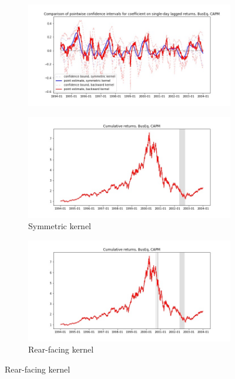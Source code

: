 \documentclass{article}
\begin{document}
\newpage

\begin{figure}

\centering

  \begin{subfigure}[b]{\textwidth}
    \includegraphics[width=\textwidth]{BusEq/pointwiseCIs_layered_CAPM.jpg}
    \label{fig:1}
  \end{subfigure}
  \begin{subfigure}[b]{0.45\textwidth}
    \includegraphics[width=\textwidth]{BusEq/full_cumrets_ofint_CAPM.jpg}
    \caption*{Symmetric kernel}
    \label{fig:2}
  \end{subfigure}
   \begin{subfigure}[b]{0.45\textwidth}
    \includegraphics[width=\textwidth]{BusEq/bwunif_full_cumrets_ofint_CAPM.jpg}
    \caption*{Rear-facing kernel}
    \label{fig:2}
  \end{subfigure}
  
\end{figure}
\end{document}
